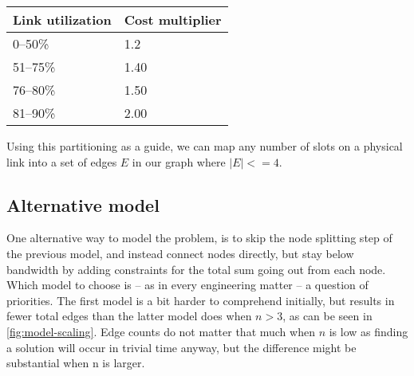 \begin{center}
    \label{tab:utilization-to-cost}
    \begin{tabular}{| l | l |}
    \hline
    \textbf{Link utilization} & \textbf{Cost multiplier} \\ \hline
    0--50\% & 1.2 \\ \hline
    51--75\% & 1.40 \\ \hline
    76--80\% & 1.50 \\ \hline
    81--90\% & 2.00 \\ \hline
    \end{tabular}
\end{center}

Using this partitioning as a guide, we can map any number of slots on a physical link into a set of edges $E$ in our graph where $|E| <= 4$.




\subsection{Alternative model}

One alternative way to model the problem, is to skip the node splitting step of the previous model, and instead connect nodes directly, but stay below bandwidth by adding constraints for the total sum going out from each node. Which model to choose is -- as in every engineering matter -- a question of priorities. The first model is a bit harder to comprehend initially, but results in fewer total edges than the latter model does when $n>3$, as can be seen in \autoref{fig:model-scaling}. Edge counts do not matter that much when $n$ is low as finding a solution will occur in trivial time anyway, but the difference might be substantial when n is larger. 

